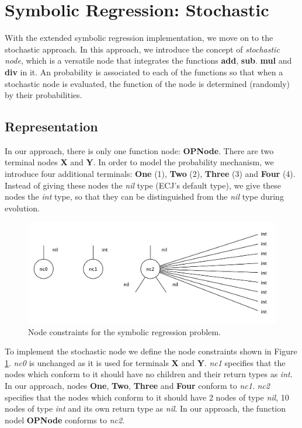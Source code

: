 \section{Symbolic Regression: Stochastic}
With the extended symbolic regression implementation, we move on to the stochastic approach. In this approach, we introduce the concept of \emph{stochastic node}, which is a versatile node that integrates the functions \textbf{add}, \textbf{sub}. \textbf{mul} and \textbf{div} in it. An probability is associated to each of the functions so that when a stochastic node is evaluated, the function of the node is determined (randomly) by their probabilities. 

\subsection{Representation}
In our approach, there is only one function node: \textbf{OPNode}. There are two terminal nodes \textbf{X} and \textbf{Y}. In order to model the probability mechanism, we introduce four additional terminals: \textbf{One} (1), \textbf{Two} (2), \textbf{Three} (3) and \textbf{Four} (4). Instead of giving these nodes the \emph{nil} type (ECJ's default type), we give these nodes the \emph{int} type, so that they can be distinguished from the \emph{nil} type during evolution. %
\begin{figure}
	\centering
	\includegraphics[width=1\linewidth]{./fig/symbolic_stochastic_ncs}
	\caption{Node constraints for the symbolic regression problem.}
	\label{fig:symb_stochastic_ncs}
\end{figure}

To implement the stochastic node we define the node constraints shown in Figure \ref{fig:symb_stochastic_ncs}. \emph{nc0} is unchanged as it is used for terminals \textbf{X} and \textbf{Y}. \emph{nc1} specifies that the nodes which conform to it should have no children and their return types as \emph{int}. In our approach, nodes \textbf{One}, \textbf{Two}, \textbf{Three} and \textbf{Four} conform to \emph{nc1}. \emph{nc2} specifies that the nodes which conform to it should have 2 nodes of type \emph{nil}, 10 nodes of type \emph{int} and its own return type as \emph{nil}. In our approach, the function nodel \textbf{OPNode} conforms to \emph{nc2}. 



